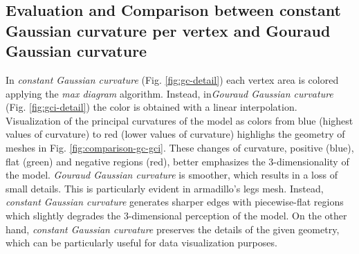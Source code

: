 \subsection{Evaluation and Comparison between constant Gaussian curvature per vertex and Gouraud Gaussian curvature}
In \textit{constant Gaussian curvature} (Fig. \ref{fig:gc-detail}) each vertex area is colored applying the \textit{max diagram} algorithm. Instead, in\textit{Gouraud Gaussian curvature} (Fig. \ref{fig:gci-detail}) the color is obtained with a linear interpolation.
Visualization of the principal curvatures of the model as colors from blue (highest values of curvature) to red (lower values of curvature) highlighs the geometry of meshes in Fig. \ref{fig:comparison-gc-gci}.
These changes of curvature, positive (blue), flat (green) and negative regions (red), better emphasizes the 3-dimensionality of the model.
\textit{Gouraud Gaussian curvature} is smoother, which results in a loss of small details. This is particularly evident in armadillo's legs mesh. Instead, \textit{constant Gaussian curvature} generates sharper edges with piecewise-flat regions which slightly degrades the 3-dimensional perception of the model.
On the other hand, \textit{constant Gaussian curvature} preserves the details of the given geometry, which can be particularly useful for data visualization purposes.

